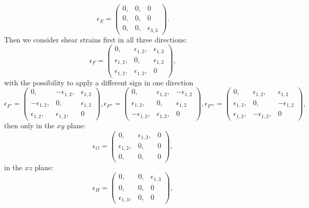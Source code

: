 \documentclass[12pt,a4paper,twoside]{report}
\begin{document}
\begin{equation}
\epsilon_E=\left( \begin{array}{ccc}
0, & 0, & 0 
\\
0, & 0, & 0 
\\
0, & 0, & \epsilon_{3,3}
\end{array}
\right).
\end{equation}
Then we consider shear strains first in all three directions:
\begin{equation}
\epsilon_F=\left( \begin{array}{ccc}
0, & \epsilon_{1,2}, & \epsilon_{1,2}
\\
\epsilon_{1,2}, & 0, & \epsilon_{1,2} 
\\
\epsilon_{1,2}, & \epsilon_{1,2}, & 0
\end{array}
\right),
\end{equation}
with the possibility to apply a different sign in one direction
\begin{equation}
\epsilon_{F'}=\left( \begin{array}{ccc}
0, & -\epsilon_{1,2}, & \epsilon_{1,2}
\\
-\epsilon_{1,2}, & 0, & \epsilon_{1,2} 
\\
\epsilon_{1,2}, & \epsilon_{1,2}, & 0
\end{array}
\right),
\epsilon_{F''}=\left( \begin{array}{ccc}
0, & \epsilon_{1,2}, & -\epsilon_{1,2}
\\
\epsilon_{1,2}, & 0, & \epsilon_{1,2} 
\\
-\epsilon_{1,2}, & \epsilon_{1,2}, & 0
\end{array}
\right),
\epsilon_{F'''}=\left( \begin{array}{ccc}
0, & \epsilon_{1,2}, & \epsilon_{1,2}
\\
\epsilon_{1,2}, & 0, & -\epsilon_{1,2} 
\\
\epsilon_{1,2}, & -\epsilon_{1,2}, & 0
\end{array}
\right),
\end{equation}
then only in the $xy$ plane:
\begin{equation}
\epsilon_G=\left( \begin{array}{ccc}
0, & \epsilon_{1,2}, & 0
\\
\epsilon_{1,2}, & 0, & 0
\\
0, & 0, & 0
\end{array}
\right),
\end{equation}
in the $xz$ plane:
\begin{equation}
\epsilon_H=\left( \begin{array}{ccc}
0, & 0, & \epsilon_{1,3}
\\
0, & 0, & 0
\\
\epsilon_{1,3}, & 0, & 0
\end{array}
\right),
\end{equation}
\end{document}
